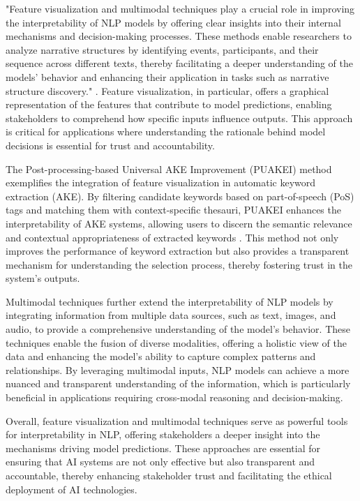 "Feature visualization and multimodal techniques play a crucial role in improving the interpretability of NLP models by offering clear insights into their internal mechanisms and decision-making processes. These methods enable researchers to analyze narrative structures by identifying events, participants, and their sequence across different texts, thereby facilitating a deeper understanding of the models' behavior and enhancing their application in tasks such as narrative structure discovery." \cite{jannidis2016analyzingfeaturesdetectionhappy}. Feature visualization, in particular, offers a graphical representation of the features that contribute to model predictions, enabling stakeholders to comprehend how specific inputs influence outputs. This approach is critical for applications where understanding the rationale behind model decisions is essential for trust and accountability.



The Post-processing-based Universal AKE Improvement (PUAKEI) method exemplifies the integration of feature visualization in automatic keyword extraction (AKE). By filtering candidate keywords based on part-of-speech (PoS) tags and matching them with context-specific thesauri, PUAKEI enhances the interpretability of AKE systems, allowing users to discern the semantic relevance and contextual appropriateness of extracted keywords \cite{altuncu2022improvingperformanceautomatickeyword}. This method not only improves the performance of keyword extraction but also provides a transparent mechanism for understanding the selection process, thereby fostering trust in the system's outputs.



Multimodal techniques further extend the interpretability of NLP models by integrating information from multiple data sources, such as text, images, and audio, to provide a comprehensive understanding of the model's behavior. These techniques enable the fusion of diverse modalities, offering a holistic view of the data and enhancing the model's ability to capture complex patterns and relationships. By leveraging multimodal inputs, NLP models can achieve a more nuanced and transparent understanding of the information, which is particularly beneficial in applications requiring cross-modal reasoning and decision-making.



Overall, feature visualization and multimodal techniques serve as powerful tools for interpretability in NLP, offering stakeholders a deeper insight into the mechanisms driving model predictions. These approaches are essential for ensuring that AI systems are not only effective but also transparent and accountable, thereby enhancing stakeholder trust and facilitating the ethical deployment of AI technologies.





